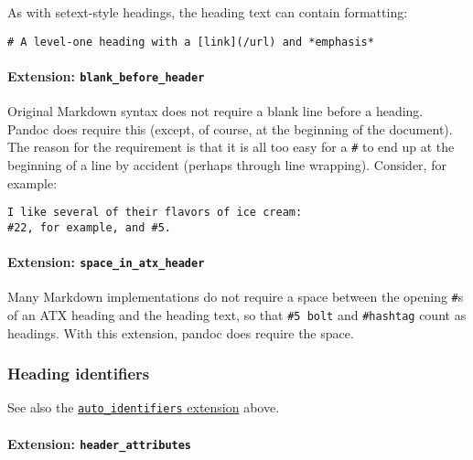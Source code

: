 As with setext-style headings, the heading text can contain formatting:

\begin{verbatim}
# A level-one heading with a [link](/url) and *emphasis*
\end{verbatim}

\hypertarget{extension-blank_before_header}{%
\paragraph{\texorpdfstring{Extension:
\texttt{blank\_before\_header}}{Extension: blank\_before\_header}}\label{extension-blank_before_header}}

Original Markdown syntax does not require a blank line before a heading.
Pandoc does require this (except, of course, at the beginning of the
document). The reason for the requirement is that it is all too easy for
a \texttt{\#} to end up at the beginning of a line by accident (perhaps
through line wrapping). Consider, for example:

\begin{verbatim}
I like several of their flavors of ice cream:
#22, for example, and #5.
\end{verbatim}

\hypertarget{extension-space_in_atx_header}{%
\paragraph{\texorpdfstring{Extension:
\texttt{space\_in\_atx\_header}}{Extension: space\_in\_atx\_header}}\label{extension-space_in_atx_header}}

Many Markdown implementations do not require a space between the opening
\texttt{\#}s of an ATX heading and the heading text, so that
\texttt{\#5\ bolt} and \texttt{\#hashtag} count as headings. With this
extension, pandoc does require the space.

\hypertarget{heading-identifiers}{%
\subsubsection{Heading identifiers}\label{heading-identifiers}}

See also the
\protect\hyperlink{extension-auto_identifiers}{\texttt{auto\_identifiers}
extension} above.

\hypertarget{extension-header_attributes}{%
\paragraph{\texorpdfstring{Extension:
\texttt{header\_attributes}}{Extension: header\_attributes}}\label{extension-header_attributes}}

